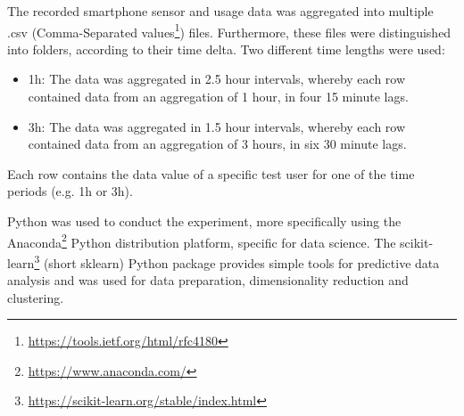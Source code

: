 The recorded smartphone sensor and usage data was aggregated into multiple .csv (Comma-Separated values\footnote{\url{https://tools.ietf.org/html/rfc4180}}) files. Furthermore, these files were distinguished into folders, according to their time delta. Two different time lengths were used:

\begin{itemize}
  \item 1h: The data was aggregated in 2.5 hour intervals, whereby each row contained data from an aggregation of 1 hour, in four 15 minute lags.
  \item 3h: The data was aggregated in 1.5 hour intervals, whereby each row contained data from an aggregation of 3 hours, in six 30 minute lags.
\end{itemize}

Each row contains the data value of a specific test user for one of the time periods (e.g. 1h or 3h).

Python was used to conduct the experiment, more specifically using the Anaconda\footnote{\url{https://www.anaconda.com/}} Python distribution platform, specific for data science. The scikit-learn\footnote{\url{https://scikit-learn.org/stable/index.html}} (short sklearn) Python package provides simple tools for predictive data analysis and was used for data preparation, dimensionality reduction and clustering.








